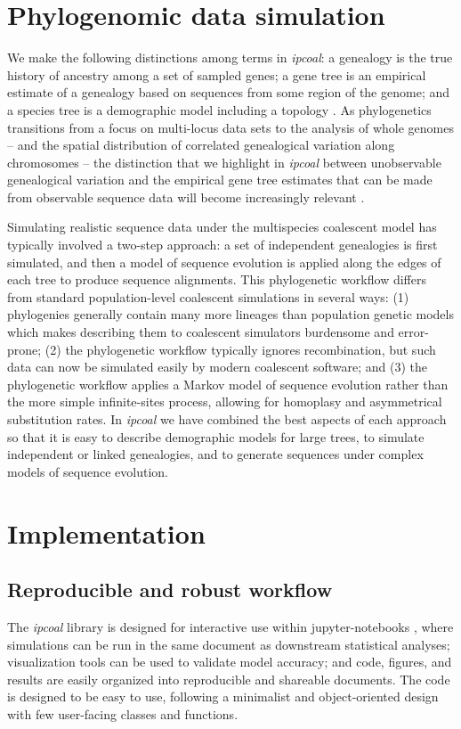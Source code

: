 \documentclass[11pt]{article}
\begin{document}
\section{Phylogenomic data simulation}
We make the following distinctions among terms in \emph{ipcoal}: a genealogy is the true history of ancestry among a set of sampled genes; a gene tree is an empirical estimate of a genealogy based on sequences from some region of the genome; and a species tree is a demographic model including a topology \citep{maddison_gene_1997,pamilo_relationships_1988}. As phylogenetics transitions from a focus on multi-locus data sets \citep{knowles_estimating_2011} to the analysis of whole genomes -- and the spatial distribution of correlated genealogical variation along chromosomes -- the distinction that we highlight in \emph{ipcoal} between unobservable genealogical variation and the empirical gene tree estimates that can be made from observable sequence data will become increasingly relevant \citep{adams_binning_2019,posada_recombination_2002}. 

Simulating realistic sequence data under the multispecies coalescent model has typically involved a two-step approach: a set of independent genealogies is first simulated, and then a model of sequence evolution is applied along the edges of each tree to produce sequence alignments. This phylogenetic workflow differs from standard population-level coalescent simulations in several ways: (1) phylogenies generally contain many more lineages than population genetic models which makes describing them to coalescent simulators burdensome and error-prone; (2) the phylogenetic workflow typically ignores recombination, but such data can now be simulated easily by modern coalescent software; and (3) the phylogenetic workflow applies a Markov model of sequence evolution rather than the more simple infinite-sites process, allowing for homoplasy and asymmetrical substitution rates. In \emph{ipcoal} we have combined the best aspects of each approach so that it is easy to describe demographic models for large trees, to simulate independent or linked genealogies, and to generate sequences under complex models of sequence evolution. 

\section{Implementation}
\label{sec:headings}
\subsection{Reproducible and robust workflow}
The \emph{ipcoal} library is designed for interactive use within jupyter-notebooks \citep{kluyver_jupyter_2016}, where simulations can be run in the same document as downstream statistical analyses; visualization tools can be used to validate model accuracy; and code, figures, and results are easily organized into reproducible and shareable documents. The code is designed to be easy to use, following a minimalist and object-oriented design with few user-facing classes and functions.
\end{document}
